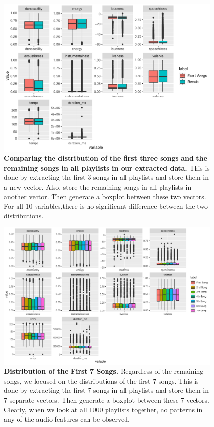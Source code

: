 \documentclass[12pt]{article}
\theoremstyle{plain}
\theoremstyle{definition}
\theoremstyle{remark}
\begin{document}
\begin{figure}[htp]
    \centering
    \includegraphics[width=\textwidth]{Images/1st3.pdf}
    \caption{\textbf{Comparing the distribution of the first three songs and the remaining songs in all playlists in our extracted data.} This is done by extracting the first 3 songs in all playlists and store them in a new vector. Also, store the remaining songs in all playlists in another vector. Then generate a boxplot between these two vectors. For all 10 variables,there is no significant difference between the two distributions.}
    \label{fig:1st3}
\end{figure}

\newpage
\begin{figure}[h]
    \centering
    \includegraphics[width=\textwidth]{Images/1st7.pdf}
    \caption{\textbf{Distribution of the First 7 Songs.} Regardless of the remaining songs, we focused on the distributions of the first 7 songs. This is done by extracting the first 7 songs in all playlists and store them in 7 separate vectors. Then generate a boxplot between these 7 vectors. Clearly, when we look at all 1000 playlists together, no patterns in any of the audio features can be observed.}
    \label{fig:1st7}
\end{figure}
\end{document}
